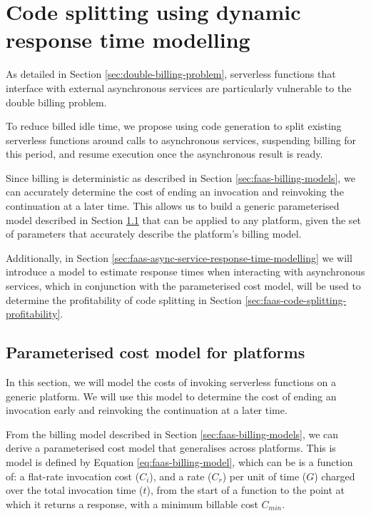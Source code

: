 \chapter{Code splitting using dynamic response time modelling}
\label{chap:concepts}

As detailed in Section \ref{sec:double-billing-problem}, serverless functions that interface with external asynchronous services are particularly vulnerable to the double billing problem.

To reduce billed idle time, we propose using code generation to split existing serverless functions around calls to asynchronous services, suspending billing for this period, and resume execution once the asynchronous result is ready.

Since \faaas{} billing is deterministic as described in Section \ref{sec:faas-billing-models}, we can accurately determine the cost of ending an invocation and reinvoking the continuation at a later time. This allows us to build a generic parameterised model described in Section \ref{sec:faas-param-cost-model} that can be applied to any \faas{} platform, given the set of parameters that accurately describe the platform's billing model.

Additionally, in Section \ref{sec:faas-async-service-response-time-modelling} we will introduce a model to estimate response times when interacting with asynchronous services, which in conjunction with the parameterised cost model, will be used to determine the profitability of code splitting in Section \ref{sec:faas-code-splitting-profitability}.

\section{Parameterised cost model for \faas{} platforms}
\label{sec:faas-param-cost-model}

In this section, we will model the costs of invoking serverless functions on a generic \faas{} platform. We will use this model to determine the cost of ending an invocation early and reinvoking the continuation at a later time.

From the billing model described in Section \ref{sec:faas-billing-models}, we can derive a parameterised cost model that generalises across \faas{} platforms. This is model is defined by Equation \ref{eq:faas-billing-model}, which can be is  a function of: a flat-rate invocation cost ($C_i$), and a rate ($C_r$) per unit of time ($G$) charged over the total invocation time ($t$), from the start of a function to the point at which it returns a response, with a minimum billable cost $C_{min}$.

